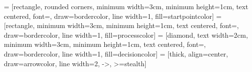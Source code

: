 \documentclass{article}
\begin{document}

 = [rectangle, rounded corners, minimum width=3cm, minimum height=1cm, text centered, font=\normalsize, draw=bordercolor, line width=1, fill=startpointcolor]
 = [rectangle, minimum width=3cm, minimum height=1cm, text centered, font=\normalsize, draw=bordercolor, line width=1, fill=processcolor]
 = [diamond, text width=2cm, minimum width=3cm, minimum height=1cm, text centered, font=\normalsize, draw=bordercolor, line width=1, fill=decisioncolor]
 = [thick, align=center, draw=arrowcolor, line width=2, ->, >=stealth]
\end{document}
